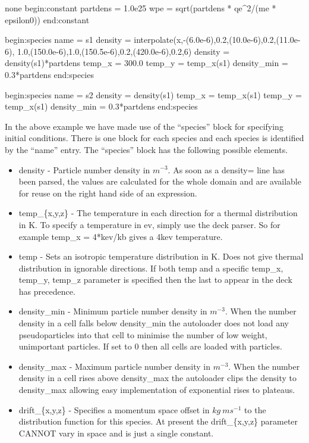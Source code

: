 \begin{nbboxverbatim}{none}
begin:constant
   partdens = 1.0e25
   wpe = sqrt(partdens * qe^2/(me * epsilon0))
end:constant

begin:species
   name = s1
   density = interpolate(x,-(6.0e-6),0.2,(10.0e-6),0.2,(11.0e-6),
            1.0,(150.0e-6),1.0,(150.5e-6),0.2,(420.0e-6),0.2,6)
   density = density(s1)*partdens
   temp_x = 300.0
   temp_y = temp_x(s1)
   density_min = 0.3*partdens
end:species

begin:species
   name = s2
   density = density(s1)
   temp_x = temp_x(s1)
   temp_y = temp_x(s1)
   density_min = 0.3*partdens
end:species
\end{nbboxverbatim}

In the above example we have made use of the ``species'' block for specifying
initial conditions. There is one block for each species
and each species is identified by the ``name'' entry.
The ``species'' block has the following possible elements.
\begin{itemize}
\item density - Particle number density in $m^{-3}$. 
  As soon as a density= line has been parsed, the values are
  calculated for the whole domain and are available for reuse on the right hand
  side of an expression.
\item temp\_\{x,y,z\} - The temperature in each direction for a thermal
  distribution in K. To specify a temperature in ev, simply use the deck
  parser. So for example temp\_x = 4*kev/kb gives a 4kev temperature.
\item temp - Sets an isotropic temperature distribution in K. Does not give
  thermal distribution in ignorable directions. If both temp and a specific
  temp\_x, temp\_y, temp\_z parameter is specified then the last to appear in
  the deck has precedence.
\item density\_min - Minimum particle number density in $m^{-3}$.
  When the number density in a cell falls below density\_min the
  autoloader does not load any
  pseudoparticles into that cell to minimise the number of low weight,
  unimportant particles. If set to 0 then all cells are loaded with particles.
\item density\_max - Maximum particle number density in $m^{-3}$. When
  the number density in a cell rises above density\_max the autoloader
  clips the density to density\_max allowing easy implementation of
  exponential rises to plateaus.
\item drift\_\{x,y,z\} - Specifies a momentum space offset in $kg\ ms^{-1}$ to
  the distribution function for this species. At present the drift\_\{x,y,z\}
  parameter CANNOT vary in space and is just a single constant.
\end{itemize}

